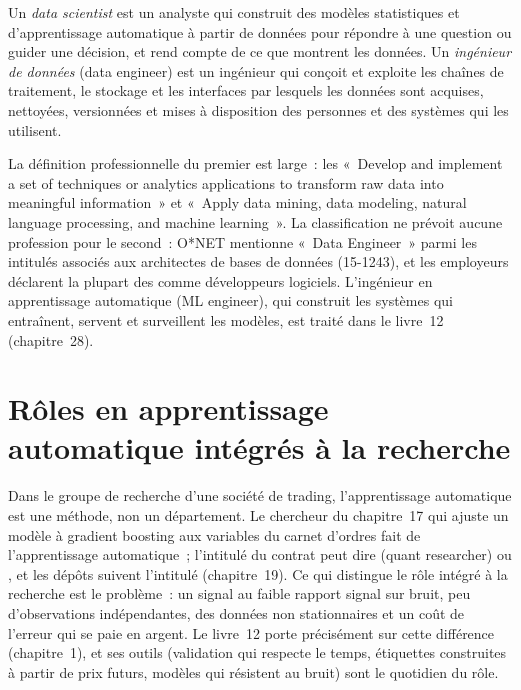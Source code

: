 \begin{definition}\label{def:in:machine-learning-and-data-engineer:roles}
Un \emph{data scientist} est un analyste qui construit des modèles statistiques et d'apprentissage automatique à partir de données
pour répondre à une question ou guider une décision, et rend compte de ce que montrent les données. Un \emph{ingénieur de données} (data engineer)
est un ingénieur qui conçoit et exploite les chaînes de traitement, le stockage et les interfaces par lesquels les données sont acquises, nettoyées,
versionnées et mises à disposition des personnes et des systèmes qui les utilisent.
\end{definition}

La définition professionnelle du premier est large~: les  «~Develop and implement a set of techniques or
analytics applications to transform raw data into meaningful information~» et «~Apply data mining, data modeling,
natural language processing, and machine learning~». La classification ne prévoit aucune profession pour le second~: O*NET
mentionne «~Data Engineer~» parmi les intitulés associés aux architectes de bases de données (15-1243), et les employeurs déclarent la plupart des  comme
développeurs logiciels. L'ingénieur en apprentissage automatique (ML engineer), qui construit les systèmes qui entraînent, servent et surveillent les modèles, est
traité dans le livre~12 (chapitre~28).

\section{Rôles en apprentissage automatique intégrés à la recherche}

Dans le groupe de recherche d'une société de trading, l'apprentissage automatique est une méthode, non un département. Le chercheur du chapitre~17 qui ajuste
un modèle à gradient boosting aux variables du carnet d'ordres fait de l'apprentissage automatique~; l'intitulé du contrat peut dire
 (quant researcher) ou , et les dépôts suivent l'intitulé (chapitre~19). Ce qui distingue le
rôle intégré à la recherche est le problème~: un signal au faible rapport signal sur bruit, peu d'observations indépendantes,
des données non stationnaires et un coût de l'erreur qui se paie en argent. Le livre~12 porte précisément sur cette différence
(chapitre~1), et ses outils (validation qui respecte le temps, étiquettes construites à partir de prix futurs, modèles qui résistent au bruit)
sont le quotidien du rôle.

